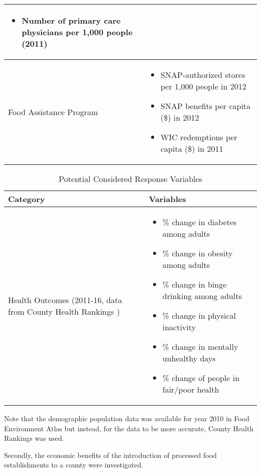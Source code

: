 \documentclass[letterpaper, 11pt]{report}
\begin{document}
\begin{table}[h]
\begin{tabularx}{\textwidth}{|p{}|X|}
\begin{itemize}
    \item Number of primary care physicians per 1,000 people (2011) \cite{countyhealthrankings}
\end{itemize}\\ \hline
Food Assistance Program & \vspace{-0.3cm} \begin{itemize}
    \item SNAP-authorized stores per 1,000 people in 2012 \cite{foodenvatlas}
    \item SNAP benefits per capita (\$) in 2012 \cite{foodenvatlas}
    \item WIC redemptions per capita (\$) in 2011 \cite{foodenvatlas}
\end{itemize} \\ \hline
\end{tabularx}
\label{table:feature_variables}
\end{table}

\begin{table}[h]
\centering
\caption{Potential Considered Response Variables}
\begin{tabularx}{\textwidth}{|p{}|X|}
\hline

\textbf{Category} & \textbf{Variables}                     \\ \hline
Health Outcomes (2011-16, data from County Health Rankings 
\cite{countyhealthrankings}) & \vspace{-0.3cm} \begin{itemize}
    \item \% change in diabetes among adults
    \item \% change in obesity among adults
    \item \% change in binge drinking among adults
    \item \% change in physical inactivity
    \item \% change in mentally unhealthy days
    \item \% change of people in fair/poor health
\end{itemize} \\ \hline
\end{tabularx}
\label{table:response_variables}
\end{table}
Note that the demographic population data was available for year 2010 in Food Environment Atlas but instead, for the data to be more accurate, County Health Rankings was used.

Secondly, the economic benefits of the introduction of processed food establishments to a county were investigated. 
\end{document}
